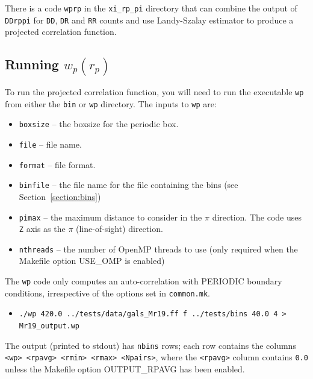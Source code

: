 \documentclass[12pt,titlepage,justified]{article}
\newcommand{\wprp}{\ensuremath{{w_p(r_p)}}\xspace}
\begin{document}
There is a code \texttt{wprp} in the \texttt{xi\_rp\_pi} directory that can combine the output of \texttt{DDrppi} for \texttt{DD}, \texttt{DR} and \texttt{RR} counts 
and use Landy-Szalay estimator to produce a projected correlation function.  

\subsection{Running \texorpdfstring{\wprp}{wp(rp)}}
To run the projected correlation function, you will need to run the executable \texttt{wp} from either the \texttt{bin} or \texttt{wp} directory. The inputs 
to \texttt{wp} are:
\begin{itemize}
\item \texttt{boxsize} -- the boxsize for the periodic box. 
\item \texttt{file}    -- file name.
\item \texttt{format}  -- file format.
\item \texttt{binfile} -- the file name for the file containing the bins (see Section~\ref{section:bins})
\item \texttt{pimax}   -- the maximum distance to consider in the $\pi$ direction. The code uses \texttt{Z} axis as the $\pi$ (line-of-sight) direction. 
\item \texttt{nthreads} -- the number of OpenMP threads to use (only required when the Makefile option USE\_OMP is enabled)
\end{itemize}
The \texttt{wp} code only computes an auto-correlation with PERIODIC boundary conditions, irrespective of the options set in \texttt{common.mk}. 
\begin{itemize}
\item {\scriptsize \texttt{./wp  420.0 ../tests/data/gals\_Mr19.ff f ../tests/bins 40.0 4 > Mr19\_output.wp}}
\end{itemize}
The output (printed to stdout) has \texttt{nbins} rows; each row contains the columns \texttt{<wp> <rpavg> <rmin> <rmax> <Npairs>}, where the \texttt{<rpavg>} column contains \texttt{0.0} unless the 
Makefile option OUTPUT\_RPAVG has been enabled. 
\end{document}
